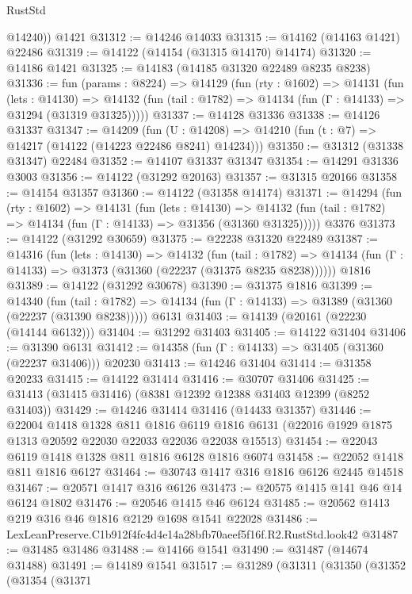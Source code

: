 \begin{lexlean}{RustStd}
\begin{coremodule}
        @14240))
    @1421
@31312 := @14246 @14033
@31315 := @14162 (@14163 @1421) @22486
@31319 := @14122 (@14154 (@31315 @14170) @14174)
@31320 := @14186 @1421
@31325 := @14183 (@14185 @31320 @22489 @8235 @8238)
@31336 := fun (params : @8224) =>
  @14129
    (fun (rty : @1602) =>
    @14131
      (fun (lets : @14130) =>
      @14132 (fun (tail : @1782) => @14134 (fun (Γ : @14133) => @31294 (@31319 @31325)))))
@31337 := @14128 @31336
@31338 := @14126 @31337
@31347 := @14209
    (fun (U : @14208) => @14210 (fun (t : @7) => @14217 (@14122 (@14223 @22486 @8241) @14234)))
@31350 := @31312 (@31338 @31347) @22484
@31352 := @14107 @31337 @31347
@31354 := @14291 @31336 @3003
@31356 := @14122 (@31292 @20163)
@31357 := @31315 @20166
@31358 := @14154 @31357
@31360 := @14122 (@31358 @14174)
@31371 := @14294
    (fun (rty : @1602) =>
    @14131
      (fun (lets : @14130) =>
      @14132 (fun (tail : @1782) => @14134 (fun (Γ : @14133) => @31356 (@31360 @31325)))))
    @3376
@31373 := @14122 (@31292 @30659)
@31375 := @22238 @31320 @22489
@31387 := @14316
    (fun (lets : @14130) =>
    @14132
      (fun (tail : @1782) =>
      @14134 (fun (Γ : @14133) => @31373 (@31360 (@22237 (@31375 @8235 @8238))))))
    @1816
@31389 := @14122 (@31292 @30678)
@31390 := @31375 @1816
@31399 := @14340
    (fun (tail : @1782) => @14134 (fun (Γ : @14133) => @31389 (@31360 (@22237 (@31390 @8238)))))
    @6131
@31403 := @14139 (@20161 (@22230 (@14144 @6132)))
@31404 := @31292 @31403
@31405 := @14122 @31404
@31406 := @31390 @6131
@31412 := @14358 (fun (Γ : @14133) => @31405 (@31360 (@22237 @31406))) @20230
@31413 := @14246 @31404
@31414 := @31358 @20233
@31415 := @14122 @31414
@31416 := @30707 @31406
@31425 := @31413 (@31415 @31416) (@8381 @12392 @12388 @31403 @12399 (@8252 @31403))
@31429 := @14246 @31414 @31416 (@14433 @31357)
@31446 := @22004
    @1418
    @1328
    @811
    @1816
    @6119
    @1816
    @6131
    (@22016 @1929 @1875 @1313 @20592 @22030 @22033 @22036 @22038 @15513)
@31454 := @22043 @6119 @1418 @1328 @811 @1816 @6128 @1816 @6074
@31458 := @22052 @1418 @811 @1816 @6127
@31464 := @30743 @1417 @316 @1816 @6126 @2445 @14518
@31467 := @20571 @1417 @316 @6126
@31473 := @20575 @1415 @141 @46 @14 @6124 @1802
@31476 := @20546 @1415 @46 @6124
@31485 := @20562 @1413 @219 @316 @46 @1816 @2129 @1698 @1541 @22028
@31486 := LexLeanPreserve.C1b912f4fc4d4e14a28bfb70aeef5f16f.R2.RustStd.look42
@31487 := @31485 @31486
@31488 := @14166 @1541
@31490 := @31487 (@14674 @31488)
@31491 := @14189 @1541
@31517 := @31289
    (@31311
      (@31350
        (@31352
          (@31354
            (@31371

\end{coremodule}
\end{lexlean}
